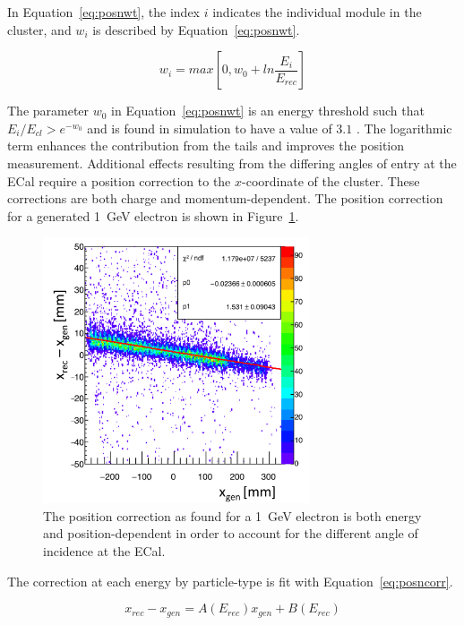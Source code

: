 In Equation~\eqref{eq:posnwt}, the index $i$ indicates the individual module in the cluster, and $w_i$ is described by Equation~\eqref{eq:posnwt}.

\begin{equation}
\label{eq:posnwt}
w_i  =  max[0, w_0+ ln\dfrac{E_i}{E_{rec}}]
\end{equation}

The parameter $w_0$ in Equation~\eqref{eq:posnwt} is an energy threshold such that $E_i/E_{cl} > e^{-w_0}$ and is found in simulation to have a value of $3.1$ \cite{szumila-vance_hps_ecal_2014}. The logarithmic term enhances the contribution from the tails and improves the position measurement. Additional effects resulting from the differing angles of entry at the ECal require a position correction to the $x$-coordinate of the cluster. These corrections are both charge and momentum-dependent. The position correction for a generated 1~GeV electron is shown in Figure~\ref{Figure:xposn1gev}.

\begin{figure}[H]
  \centering
      \includegraphics[width=0.7\textwidth]{pics/performance/xposn1gev.png}
  \caption[Horizontal position correction for 1~GeV electrons]{The position correction as found for a 1~GeV electron is both energy and position-dependent in order to account for the different angle of incidence at the ECal.}
  \label{Figure:xposn1gev}
\end{figure}

The correction at each energy by particle-type is fit with Equation~\eqref{eq:posncorr}. 

\begin{equation}
\label{eq:posncorr}
x_{rec} - x_{gen} = A(E_{rec}) x_{gen} + B(E_{rec})
\end{equation}

